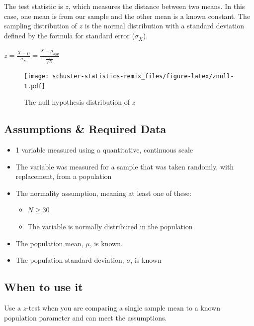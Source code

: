 \documentclass[
]{book}
\providecommand{\tightlist}{%
  \setlength{\itemsep}{0pt}\setlength{\parskip}{0pt}}
\begin{document}
The test statistic is \(z\), which measures the distance between two means. In this case, one mean is from our sample and the other mean is a known constant. The sampling distribution of \(z\) is the normal distribution with a standard deviation defined by the formula for standard error (\(\sigma_{\bar{X}}\)).

\(z = \frac{\bar{X}-\mu}{\sigma_{\bar{X}}} = \frac{\bar{X}-\mu_{hyp}}{\frac{\sigma}{\sqrt{N}}}\)

\begin{figure}
\centering
\texttt{[image: schuster-statistics-remix\_files/figure-latex/znull-1.pdf]}
\caption{\label{fig:znull}The null hypothesis distribution of \(z\)}
\end{figure}

\hypertarget{assumptions-required-data}{%
\subsection{Assumptions \& Required Data}\label{assumptions-required-data}}

\begin{itemize}
\tightlist
\item
  1 variable measured using a quantitative, continuous scale
\item
  The variable was measured for a sample that was taken randomly, with replacement, from a population
\item
  The normality assumption, meaning at least one of these:

  \begin{itemize}
  \tightlist
  \item
    \(N \ge 30\)
  \item
    The variable is normally distributed in the population
  \end{itemize}
\item
  The population mean, \(\mu\), is known.
\item
  The population standard deviation, \(\sigma\), is known
\end{itemize}

\hypertarget{when-to-use-it}{%
\subsection{When to use it}\label{when-to-use-it}}

Use a \(z\)-test when you are comparing a single sample mean to a known population parameter and can meet the assumptions.
\end{document}
